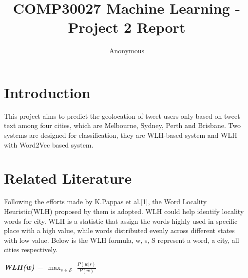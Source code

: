 \documentclass[11pt]{article}
\title{COMP30027 Machine Learning - Project 2 Report}
\author
{Anonymous}
\begin{document}
\maketitle


\section{Introduction}

This project aims to predict the geolocation of tweet users only based on tweet text among four cities, which are Melbourne, Sydney, Perth and Brisbane. Two systems are designed for classification, they are WLH-based system and WLH with Word2Vec based system.

\section{Related Literature}

Following the efforts made by K.Pappas et al.[1], the Word Locality Heuristic(WLH) proposed  by them is adopted. WLH could help identify locality words for city. WLH is a statistic that assign the words highly used in specific place with a high value, while words distributed evenly across different states with low value.
\newline\newline
Below is the WLH formula, w, s, S represent a word, a city, all cities respectively.\\

{\centerline {\textbf{\textit{WLH(w) = $\max_{s \in \mathcal{S}}$ $\frac{P(w|s)}{P(w)}$}}}}
\end{document}
